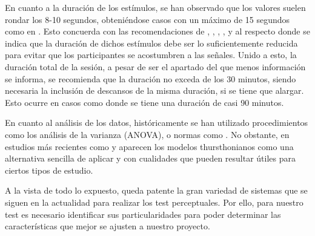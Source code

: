\documentclass[11pt,a4paper]{book}
\begin{document}
    En cuanto a la duración de los estímulos, se han observado que los valores suelen rondar los 8-10 segundos, obteniéndose casos con un máximo de 15 segundos como en \cite{2005IWitew}. Esto concuerda con las recomendaciones de \cite{UIT1116}, \cite{UIT1534}, \cite{UIT1284}, \cite{EBU3286}, \cite{UIT1285} y \cite{UIT1286} al respecto donde se indica que la duración de dichos estímulos debe ser lo suficientemente reducida para evitar que los participantes se acostumbren a las señales. Unido a esto, la duración total de la sesión, a pesar de ser el apartado del que menos información se informa, se recomienda que la duración no exceda de los 30 minutos, siendo necesaria la inclusión de descansos de la misma duración, si se tiene que alargar. Esto ocurre en casos como \cite{2019LKritly} donde se tiene una duración de casi 90 minutos.
    
    En cuanto al análisis de los datos, históricamente se han utilizado procedimientos como los análisis de la varianza (ANOVA), o normas como \cite{ISO10399}. No obstante, en estudios más recientes como \cite{delaPrida2021} y \cite{delaPrida2019} aparecen los modelos thursthonianos como una alternativa sencilla de aplicar y con cualidades que pueden resultar útiles para ciertos tipos de estudio.\newline
    
    A la vista de todo lo expuesto, queda patente la gran variedad de sistemas que se siguen en la actualidad para realizar los test perceptuales. Por ello, para nuestro test es necesario identificar sus particularidades para poder determinar las características que mejor se ajusten a nuestro proyecto.
    
    
    
    
    
    
\end{document}
